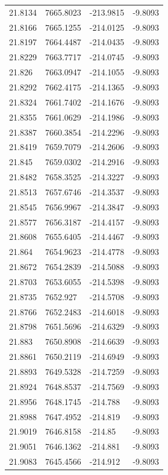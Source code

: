 \begin{table}[H]
\begin{tabular}{llll}
21.8134 & 7665.8023 & -213.9815 & -9.8093 \\
21.8166 & 7665.1255 & -214.0125 & -9.8093 \\
21.8197 & 7664.4487 & -214.0435 & -9.8093 \\
21.8229 & 7663.7717 & -214.0745 & -9.8093 \\
21.826 & 7663.0947 & -214.1055 & -9.8093 \\
21.8292 & 7662.4175 & -214.1365 & -9.8093 \\
21.8324 & 7661.7402 & -214.1676 & -9.8093 \\
21.8355 & 7661.0629 & -214.1986 & -9.8093 \\
21.8387 & 7660.3854 & -214.2296 & -9.8093 \\
21.8419 & 7659.7079 & -214.2606 & -9.8093 \\
21.845 & 7659.0302 & -214.2916 & -9.8093 \\
21.8482 & 7658.3525 & -214.3227 & -9.8093 \\
21.8513 & 7657.6746 & -214.3537 & -9.8093 \\
21.8545 & 7656.9967 & -214.3847 & -9.8093 \\
21.8577 & 7656.3187 & -214.4157 & -9.8093 \\
21.8608 & 7655.6405 & -214.4467 & -9.8093 \\
21.864 & 7654.9623 & -214.4778 & -9.8093 \\
21.8672 & 7654.2839 & -214.5088 & -9.8093 \\
21.8703 & 7653.6055 & -214.5398 & -9.8093 \\
21.8735 & 7652.927 & -214.5708 & -9.8093 \\
21.8766 & 7652.2483 & -214.6018 & -9.8093 \\
21.8798 & 7651.5696 & -214.6329 & -9.8093 \\
21.883 & 7650.8908 & -214.6639 & -9.8093 \\
21.8861 & 7650.2119 & -214.6949 & -9.8093 \\
21.8893 & 7649.5328 & -214.7259 & -9.8093 \\
21.8924 & 7648.8537 & -214.7569 & -9.8093 \\
21.8956 & 7648.1745 & -214.788 & -9.8093 \\
21.8988 & 7647.4952 & -214.819 & -9.8093 \\
21.9019 & 7646.8158 & -214.85 & -9.8093 \\
21.9051 & 7646.1362 & -214.881 & -9.8093 \\
21.9083 & 7645.4566 & -214.912 & -9.8093 \\

\end{tabular}
\end{table}

